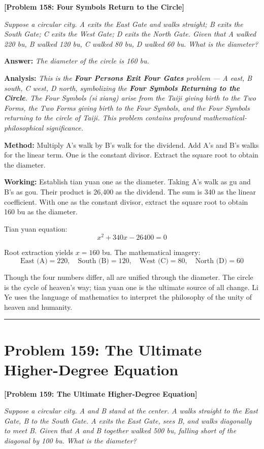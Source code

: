 \documentclass[11pt,a4paper]{book}
\newcommand{\answer}[1]{\noindent\textbf{\color{anacolor}Answer: }\textit{#1}\par}
\newcommand{\method}[1]{\noindent\textbf{\color{methodcolor}Method: }#1\par}
\newcommand{\working}[1]{\noindent\textbf{\color{workcolor}Working: }#1\par}
\newcommand{\analysis}[1]{\noindent\textbf{\color{anacolor}Analysis: }\textit{#1}\par}
\newcommand{\shortline}{\noindent\rule{0.5\textwidth}{0.4pt}\par}
\begin{document}
\noindent\textbf{\color{probcolor}[Problem 158: Four Symbols Return to the Circle]}

\textit{Suppose a circular city. A exits the East Gate and walks straight; B exits the South Gate; C exits the West Gate; D exits the North Gate. Given that A walked 220 bu, B walked 120 bu, C walked 80 bu, D walked 60 bu. What is the diameter?}

\answer{The diameter of the circle is 160 bu.}

\analysis{This is the \textbf{Four Persons Exit Four Gates} problem --- A east, B south, C west, D north, symbolizing the \textbf{Four Symbols Returning to the Circle}. The Four Symbols (\textit{si xiang}) arise from the Taiji giving birth to the Two Forms, the Two Forms giving birth to the Four Symbols, and the Four Symbols returning to the circle of Taiji. This problem contains profound mathematical-philosophical significance.}

\method{Multiply A's walk by B's walk for the dividend. Add A's and B's walks for the linear term. One is the constant divisor. Extract the square root to obtain the diameter.}

\working{Establish tian yuan one as the diameter. Taking A's walk as gu and B's as gou. Their product is 26,400 as the dividend. The sum is 340 as the linear coefficient. With one as the constant divisor, extract the square root to obtain 160 bu as the diameter.

Tian yuan equation:
$$x^2 + 340x - 26400 = 0$$

Root extraction yields $x = 160$ bu. The mathematical imagery:
$$\text{East (A)} = 220, \quad \text{South (B)} = 120, \quad \text{West (C)} = 80, \quad \text{North (D)} = 60$$

Though the four numbers differ, all are unified through the diameter. The circle is the cycle of heaven's way; tian yuan one is the ultimate source of all change. Li Ye uses the language of mathematics to interpret the philosophy of the unity of heaven and humanity.}

\shortline

\section{Problem 159: The Ultimate Higher-Degree Equation}
\label{sec:prob159}

\noindent\textbf{\color{probcolor}[Problem 159: The Ultimate Higher-Degree Equation]}

\textit{Suppose a circular city. A and B stand at the center. A walks straight to the East Gate, B to the South Gate. A exits the East Gate, sees B, and walks diagonally to meet B. Given that A and B together walked 500 bu, falling short of the diagonal by 100 bu. What is the diameter?}
\end{document}
